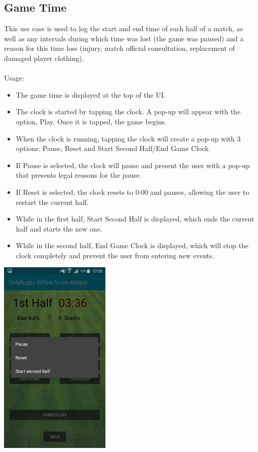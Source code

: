 \documentclass[hidelinks,a4paper,12pt]{article}
\begin{document}
\newpage

	\subsection{Game Time}
	This use case is used to log the start and end time of each half of a match, as well as any intervals during which time was lost (the game was paused) and a reason for this time loss (injury, match official consultation, replacement of damaged player clothing). 
	\\ \\
	Usage:
	\begin{itemize}
		\item The game time is displayed at the top of the UI.
		\item The clock is started by tapping the clock. A pop-up will appear with the option, Play. Once it is tapped, the game begins.
		\item When the clock is running, tapping the clock will create a pop-up with 3 options: Pause, Reset and Start Second Half/End Game Clock.
		\item If Pause is selected, the clock will pause and present the user with a pop-up that presents legal reasons for the pause.
		\item If Reset is selected, the clock resets to 0:00 and pauses, allowing the user to restart the current half.
		\item While in the first half, Start Second Half is displayed, which ends the current half and starts the new one.
		\item While in the second half, End Game Clock is displayed, which will stop the clock completely and prevent the user from entering new events.
	\end{itemize}

	\begin{center}
    		\includegraphics[width=0.4\textwidth]{./images/game_clock.jpg}
  	\end{center}
	
\end{document}
